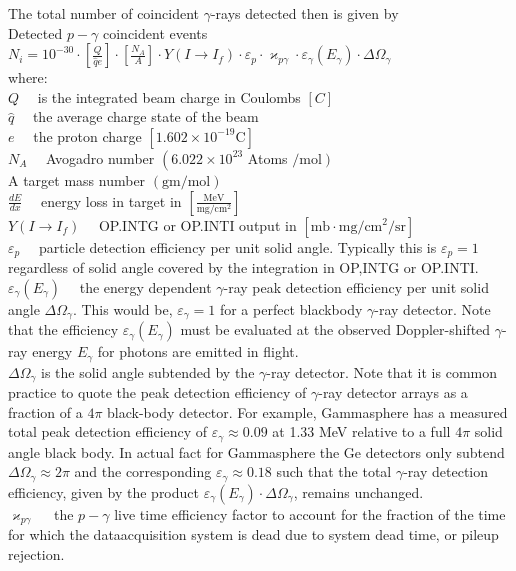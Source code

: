 \documentclass[10pt]{article}
\begin{document}
The total number of coincident $\gamma$-rays detected then is given by\\
Detected $p-\gamma$ coincident events $N_{i}=10^{-30} \cdot\left[\frac{Q}{\hat{q} e}\right] \cdot\left[\frac{N_{A}}{A}\right] \cdot Y\left(I \rightarrow I_{f}\right) \cdot \varepsilon_{p} \cdot \varkappa_{p \gamma} \cdot \varepsilon_{\gamma}\left(E_{\gamma}\right) \cdot \Delta \Omega_{\gamma}$\\
where:\\
$Q \quad$ is the integrated beam charge in Coulombs $[C]$\\
$\hat{q} \quad$ the average charge state of the beam\\
$e \quad$ the proton charge $\left[1.602 \times 10^{-19} \mathrm{C}\right]$\\
$N_{A} \quad$ Avogadro number $\left(6.022 \times 10^{23}\right.$ Atoms $\left./ \mathrm{mol}\right)$\\
A target mass number $(\mathrm{gm} / \mathrm{mol})$\\
$\frac{d E}{d x} \quad$ energy loss in target in $\left[\frac{\mathrm{MeV}}{\mathrm{mg} / \mathrm{cm}^{2}}\right]$\\
$Y\left(I \rightarrow I_{f}\right) \quad$ OP.INTG or OP.INTI output in $\left[\mathrm{mb} \cdot \mathrm{mg} / \mathrm{cm}^{2} / \mathrm{sr}\right]$\\
$\varepsilon_{p} \quad$ particle detection efficiency per unit solid angle. Typically this is $\varepsilon_{p}=1$ regardless of solid angle covered by the integration in OP,INTG or OP.INTI.\\
$\varepsilon_{\gamma}\left(E_{\gamma}\right) \quad$ the energy dependent $\gamma$-ray peak detection efficiency per unit solid angle $\Delta \Omega_{\gamma}$. This would be, $\varepsilon_{\gamma}=1$ for a perfect blackbody $\gamma$-ray detector. Note that the efficiency $\varepsilon_{\gamma}\left(E_{\gamma}\right)$ must be evaluated at the observed Doppler-shifted $\gamma$-ray energy $E_{\gamma}$ for photons are emitted in flight.\\
$\Delta \Omega_{\gamma}$ is the solid angle subtended by the $\gamma$-ray detector. Note that it is common practice to quote the peak detection efficiency of $\gamma$-ray detector arrays as a fraction of a $4 \pi$ black-body detector. For example, Gammasphere has a measured total peak detection efficiency of $\varepsilon_{\gamma} \approx 0.09$ at 1.33 MeV relative to a full $4 \pi$ solid angle black body. In actual fact for Gammasphere the Ge detectors only subtend $\Delta \Omega_{\gamma} \approx 2 \pi$ and the corresponding $\varepsilon_{\gamma} \approx 0.18$ such that the total $\gamma$-ray detection efficiency, given by the product $\varepsilon_{\gamma}\left(E_{\gamma}\right) \cdot \Delta \Omega_{\gamma}$, remains unchanged.\\
$\varkappa_{p \gamma} \quad$ the $p-\gamma$ live time efficiency factor to account for the fraction of the time for which the dataacquisition system is dead due to system dead time, or pileup rejection.
\end{document}
